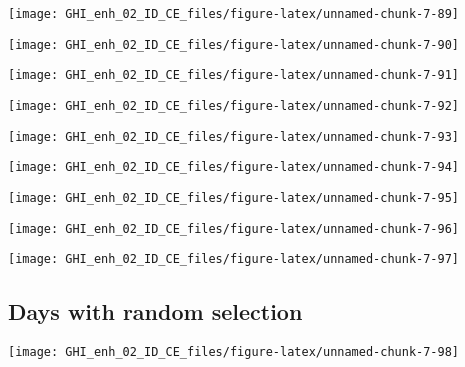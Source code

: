\documentclass[
  10pt,
  a4paper,oneside]{article}
\begin{document}
\begin{center}\texttt{[image: GHI\_enh\_02\_ID\_CE\_files/figure-latex/unnamed-chunk-7-89]} \end{center}

\begin{center}\texttt{[image: GHI\_enh\_02\_ID\_CE\_files/figure-latex/unnamed-chunk-7-90]} \end{center}

\begin{center}\texttt{[image: GHI\_enh\_02\_ID\_CE\_files/figure-latex/unnamed-chunk-7-91]} \end{center}

\begin{center}\texttt{[image: GHI\_enh\_02\_ID\_CE\_files/figure-latex/unnamed-chunk-7-92]} \end{center}

\begin{center}\texttt{[image: GHI\_enh\_02\_ID\_CE\_files/figure-latex/unnamed-chunk-7-93]} \end{center}

\begin{center}\texttt{[image: GHI\_enh\_02\_ID\_CE\_files/figure-latex/unnamed-chunk-7-94]} \end{center}

\begin{center}\texttt{[image: GHI\_enh\_02\_ID\_CE\_files/figure-latex/unnamed-chunk-7-95]} \end{center}

\begin{center}\texttt{[image: GHI\_enh\_02\_ID\_CE\_files/figure-latex/unnamed-chunk-7-96]} \end{center}

\begin{center}\texttt{[image: GHI\_enh\_02\_ID\_CE\_files/figure-latex/unnamed-chunk-7-97]} \end{center}

\FloatBarrier

\hypertarget{days-with-random-selection}{%
\subsection{Days with random selection}\label{days-with-random-selection}}

\begin{center}\texttt{[image: GHI\_enh\_02\_ID\_CE\_files/figure-latex/unnamed-chunk-7-98]} \end{center}
\end{document}
